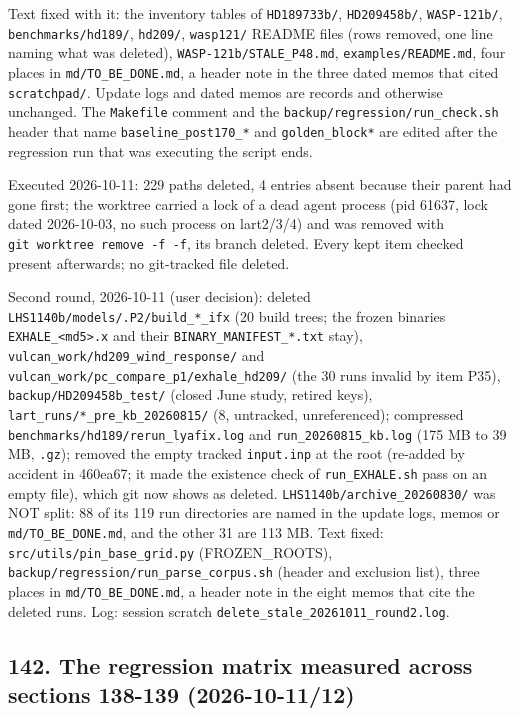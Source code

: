 \documentclass[english,a4paper]{my_memo}
\begin{document}
Text fixed with it: the inventory tables of \texttt{HD189733b/}, \texttt{HD209458b/}, \texttt{WASP-121b/}, \texttt{benchmarks/hd189/}, \texttt{hd209/}, \texttt{wasp121/} README files (rows removed, one line naming what was deleted), \texttt{WASP-121b/STALE\_P48.md}, \texttt{examples/README.md}, four places in \texttt{md/TO\_BE\_DONE.md}, a header note in the three dated memos that cited \texttt{scratchpad/}. Update logs and dated memos are records and otherwise unchanged. The \texttt{Makefile} comment and the \texttt{backup/regression/run\_check.sh} header that name \texttt{baseline\_post170\_*} and \texttt{golden\_block*} are edited after the regression run that was executing the script ends.

Executed 2026-10-11: 229 paths deleted, 4 entries absent because their parent had gone first; the worktree carried a lock of a dead agent process (pid 61637, lock dated 2026-10-03, no such process on lart2/3/4) and was removed with \texttt{git\ worktree\ remove\ -f\ -f}, its branch deleted. Every kept item checked present afterwards; no git-tracked file deleted.

Second round, 2026-10-11 (user decision): deleted \texttt{LHS1140b/models/.P2/build\_*\_ifx} (20 build trees; the frozen binaries \texttt{EXHALE\_\textless{}md5\textgreater{}.x} and their \texttt{BINARY\_MANIFEST\_*.txt} stay), \texttt{vulcan\_work/hd209\_wind\_response/} and \texttt{vulcan\_work/pc\_compare\_p1/exhale\_hd209/} (the 30 runs invalid by item P35), \texttt{backup/HD209458b\_test/} (closed June study, retired keys), \texttt{lart\_runs/*\_pre\_kb\_20260815/} (8, untracked, unreferenced); compressed \texttt{benchmarks/hd189/rerun\_lyafix.log} and \texttt{run\_20260815\_kb.log} (175 MB to 39 MB, \texttt{.gz}); removed the empty tracked \texttt{input.inp} at the root (re-added by accident in 460ea67; it made the existence check of \texttt{run\_EXHALE.sh} pass on an empty file), which git now shows as deleted. \texttt{LHS1140b/archive\_20260830/} was NOT split: 88 of its 119 run directories are named in the update logs, memos or \texttt{md/TO\_BE\_DONE.md}, and the other 31 are 113 MB. Text fixed: \texttt{src/utils/pin\_base\_grid.py} (FROZEN\_ROOTS), \texttt{backup/regression/run\_parse\_corpus.sh} (header and exclusion list), three places in \texttt{md/TO\_BE\_DONE.md}, a header note in the eight memos that cite the deleted runs. Log: session scratch \texttt{delete\_stale\_20261011\_round2.log}.

\subsection{142. The regression matrix measured across sections 138-139 (2026-10-11/12)}\label{142-the-regression-matrix-measured-across-sections-138-139-2026-10-1112}
\end{document}
